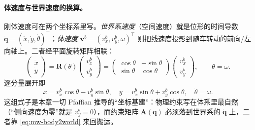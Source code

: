 \paragraph{体速度与世界速度的换算。}
刚体速度可在两个坐标系里写。\emph{世界系速度}（空间速度）就是位形的时间导数 $\dot{\mathbf{q}}=(\dot x,\dot y,\dot\theta)^\top$；\emph{体速度} $\mathbf{v}^b=(v_x^b,v_y^b,\omega)^\top$ 则把线速度投影到随车转动的前向/左向轴上。二者经平面旋转矩阵相联：
\begin{equation}
  \begin{pmatrix}\dot x\\\dot y\end{pmatrix}
  =\mathbf{R}(\theta)\begin{pmatrix}v_x^b\\v_y^b\end{pmatrix}
  =\begin{pmatrix}\cos\theta&-\sin\theta\\\sin\theta&\cos\theta\end{pmatrix}\begin{pmatrix}v_x^b\\v_y^b\end{pmatrix},
  \qquad \dot\theta=\omega.
  \label{eq:mw-body2world}
\end{equation}
逐分量展开即
\begin{equation}
  \dot x=v_x^b\cos\theta-v_y^b\sin\theta,\quad
  \dot y=v_x^b\sin\theta+v_y^b\cos\theta,\quad
  \dot\theta=\omega.
  \label{eq:mw-body2world-comp}
\end{equation}
这组式子是本章一切 Pfaffian 推导的“坐标基建”：物理约束写在体系里最自然（“侧向速度为零”就是 $v_y^b=0$），而约束矩阵 $\mathbf{A}(\mathbf{q})$ 必须落到世界系的 $\dot{\mathbf{q}}$ 上，二者靠 \cref{eq:mw-body2world} 来回搬运。

